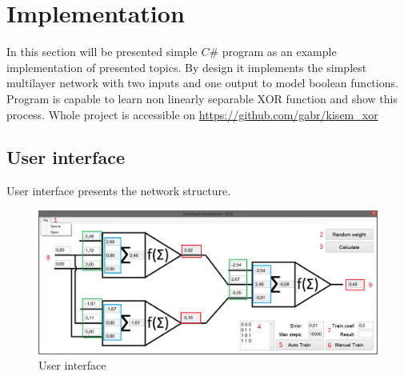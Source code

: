 \section{Implementation}
\label{Implementation}

In this section will be presented simple $C\#$ program as an example implementation of presented topics.
By design it implements the simplest multilayer network with two inputs and one output to model boolean functions.
Program is capable to learn non linearly separable XOR function and show this process.
Whole project is accessible on \url{https://github.com/gabr/kisem_xor}
\subsection{User interface}
\label{UserInterface}

User interface presents the network structure.

\begin{figure}[!h]
    \centering
    \includegraphics[scale=0.45]{Media/UI_numbers.png}
    \caption{User interface}
    \label{fig:UInumbers}
\end{figure}


